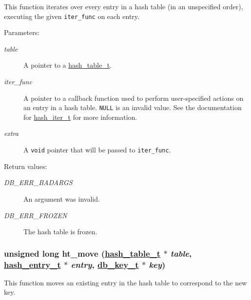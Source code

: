 This function iterates over every entry in a hash table (in an unspecified order), executing the given {\tt iter\_\-func} on each entry.

\begin{Desc}
\item[Parameters:]
\begin{description}
\item[{\em table}]A pointer to a \hyperlink{group__dbprim__hash_a0}{hash\_\-table\_\-t}. \item[{\em iter\_\-func}]A pointer to a callback function used to perform user-specified actions on an entry in a hash table. {\tt NULL} is an invalid value. See the documentation for \hyperlink{group__dbprim__hash_a2}{hash\_\-iter\_\-t} for more information. \item[{\em extra}]A {\tt void} pointer that will be passed to {\tt iter\_\-func}.\end{description}
\end{Desc}
\begin{Desc}
\item[Return values:]
\begin{description}
\item[{\em DB\_\-ERR\_\-BADARGS}]An argument was invalid. \item[{\em DB\_\-ERR\_\-FROZEN}]The hash table is frozen. \end{description}
\end{Desc}
\hypertarget{group__dbprim__hash_a8}{
\subsubsection[ht\_\-move]{\setlength{\rightskip}{0pt plus 5cm}unsigned long ht\_\-move (\hyperlink{dbprim_8h_a0}{hash\_\-table\_\-t} $\ast$ {\em table}, \hyperlink{dbprim_8h_a1}{hash\_\-entry\_\-t} $\ast$ {\em entry}, \hyperlink{dbprim_8h_a0}{db\_\-key\_\-t} $\ast$ {\em key})}}
\label{group__dbprim__hash_a8}


This function moves an existing entry in the hash table to correspond to the new key.

